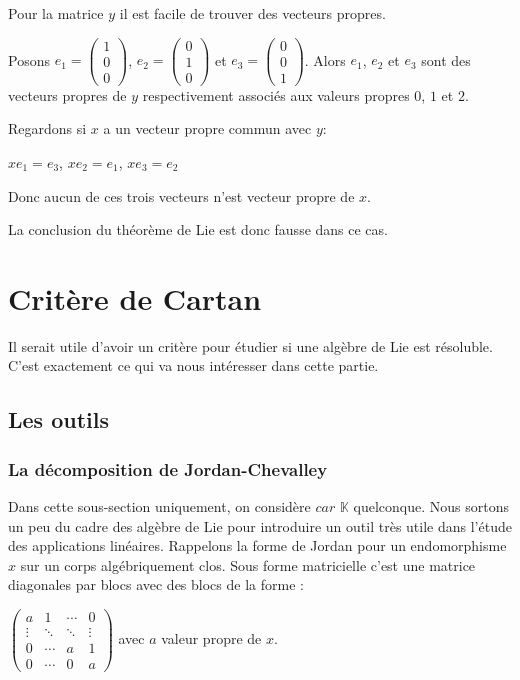 \documentclass[a4paper,openany,12pt]{report}
\newcommand{\KK}{\mathbb{K}}
\theoremstyle{break}
{\theorembodyfont{\upshape}
\newtheorem*{rmq}{Remarque :}
\newtheorem*{prv}{Preuve :}
\newtheorem*{ex}{Exemples :}
\newtheorem*{exe}{Exemple : }
\newtheorem*{nota}{Notation :}
\newtheorem*{dem}{D\'emonstration :}}
\begin{document}
\begin{exe}
\bigskip
Pour la matrice $y$ il est facile de trouver des vecteurs propres.

Posons $e_1 = \begin{pmatrix}1 \\ 0 \\ 0\end{pmatrix}$, $e_2 = \begin{pmatrix}0 \\ 1 \\ 0 \end{pmatrix}$ et $e_3 = \begin{pmatrix}0 \\ 0 \\ 1\end{pmatrix}$. Alors $e_1$, $e_2$ et $e_3$ sont des vecteurs propres de $y$ respectivement associés aux valeurs propres $0$, $1$ et $2$.

Regardons si $x$ a un vecteur propre commun avec $y$:
\begin{center}
$xe_1 = e_3$, \quad $xe_2=e_1$, \quad $xe_3=e_2$
\end{center}

Donc aucun de ces trois vecteurs n'est vecteur propre de $x$. 

La conclusion du théorème de Lie est donc fausse dans ce cas. 
\end{exe}


\chapter{Critère de Cartan}

Il serait utile d'avoir un critère pour étudier si une algèbre de Lie est résoluble. C'est exactement ce qui va nous intéresser dans cette partie. 

\section{Les outils}

\subsection{La décomposition de Jordan-Chevalley}

Dans cette sous-section uniquement, on considère $car$ $\KK$ quelconque. Nous sortons un peu du cadre des algèbre de Lie pour introduire un outil très utile dans l’étude des applications linéaires. Rappelons la forme de Jordan pour un endomorphisme $x$ sur un corps algébriquement clos. Sous forme matricielle c'est une matrice diagonales par blocs avec des blocs de la forme :
\begin{center}
$
\begin{pmatrix}
a & 1 & \cdots & 0 \\
\vdots & \ddots & \ddots & \vdots \\
 0 & \cdots & a & 1 \\
0 & \cdots & 0 & a
\end{pmatrix}
$ avec $a$ valeur propre de $x$.
\end{center}
\end{document}
